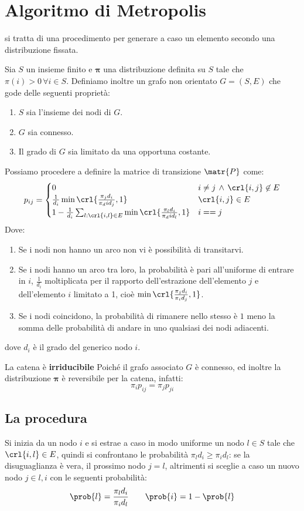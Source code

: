 \documentclass[\main/main.tex]{subfiles}
\begin{document}
\section{Algoritmo di Metropolis}
si tratta di una procedimento per generare a caso un elemento secondo una distribuzione fissata.

Sia \(S\) un insieme finito e \(\bm{\pi} \) una distribuzione definita su \(S\) tale che \(\pi(i) > 0 \, \forall i \in S\). Definiamo inoltre un grafo non orientato \(G = (S, E)\) che gode delle seguenti proprietà:
\begin{enumerate}
  \item \(S\) sia l'insieme dei nodi di \(G\).
  \item \(G\) sia connesso.
  \item Il grado di \(G\) sia limitato da una opportuna costante.
\end{enumerate}

Possiamo procedere a definire la matrice di transizione \(\matr{P}\) come:
\[
  p_{ij} = \begin{cases}
    0                                                                                & i \neq j \, \land \, \crl{i, j} \not\in E \\
    \frac{1}{d_i}\min\crl{\frac{\pi_j d_i}{\pi_di d_j}, 1}                           & \crl{i,j} \in E                           \\
    1-\frac{1}{d_i}\sum_{l:\crl{i,l} \in E}\min\crl{\frac{\pi_l d_i}{\pi_di d_l}, 1} & i==j
  \end{cases}
\]
Dove:
\begin{enumerate}
  \item Se i nodi non hanno un arco non vi è possibilità di transitarvi.
  \item Se i nodi hanno un arco tra loro, la probabilità è pari all'uniforme di entrare in \(i\), \(\frac{1}{d_i}\) moltiplicata per il rapporto dell'estrazione dell'elemento \(j\) e dell'elemento \(i\) limitato a 1, cioè \(\min\crl{\frac{\pi_j d_i}{\pi_i d_j}, 1}\).
  \item Se i nodi coincidono, la probabilità di rimanere nello stesso è \(1\) meno la somma delle probabilità di andare in uno qualsiasi dei nodi adiacenti.
\end{enumerate}
dove \(d_i\) è il grado del generico nodo \(i\).

La catena è \textbf{irriducibile} Poiché il grafo associato \(G\) è connesso, ed inoltre la distribuzione \(\bm{\pi} \) è reversibile per la catena, infatti:
\[
  \pi_i p_{ij} = \pi_j p_{ji}
\]

\subsection{La procedura}
Si inizia da un nodo \(i\) e si estrae a caso in modo uniforme un nodo \(l \in S\) tale che \(\crl{i,l} \in E\), quindi si confrontano le probabilità \(\pi_l d_i \geq \pi_i d_l\): se la disuguaglianza è vera, il prossimo nodo \(j=l\), altrimenti si sceglie a caso un nuovo nodo \(j \in {l, i}\) con le seguenti probabilità:
\[
  \prob{l} = \frac{\pi_l d_i}{\pi_i d_l} \qquad \prob{i} = 1- \prob{l}
\]
\end{document}
